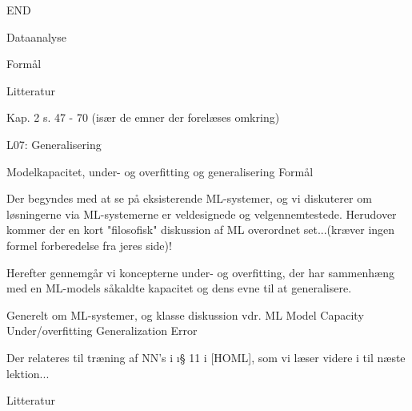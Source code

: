 








END


Dataanalyse

Formål


Litteratur

Kap. 2  s. 47 - 70 (især de emner der forelæses omkring)




L07: Generalisering

Modelkapacitet, under- og overfitting og generalisering
Formål

Der begyndes med at se på eksisterende ML-systemer, og vi diskuterer om
løsningerne via ML-systemerne er veldesignede og velgennemtestede.  Herudover
kommer der en kort "filosofisk" diskussion af ML overordnet set...(kræver ingen
formel forberedelse fra jeres side)!

Herefter gennemgår vi koncepterne under- og overfitting, der har sammenhæng med
en ML-models såkaldte kapacitet og dens evne til at generalisere.

    Generelt om ML-systemer, og klasse diskussion vdr. ML
    Model Capacity
    Under/overfitting
    Generalization Error

Der relateres til træning af NN's i \i{§ 11} i [HOML], som vi læser videre i til
næste lektion...

Litteratur

